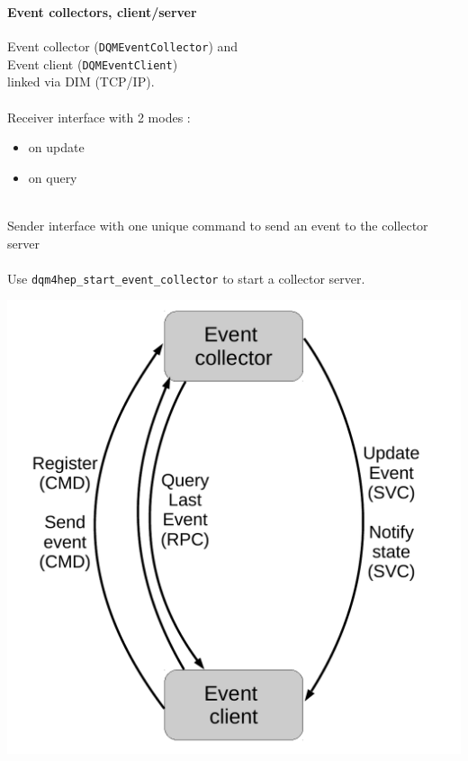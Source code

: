 \documentclass[8pt]{beamer}
\begin{document}
  \begin{frame}[containsverbatim]
    \frametitle{\secname}
    \framesubtitle{Event collectors, client/server}
    
    \begin{minipage}{0.52\textwidth}
        Event collector (\verb|DQMEventCollector|) and \\
        Event client (\verb|DQMEventClient|) \\
        linked via DIM (TCP/IP).\\
        ~ \\
        Receiver interface with 2 modes :
        \begin{itemize}
          \item on update
          \item on query
        \end{itemize}
        ~ \\
        Sender interface with one unique command to send an event to the collector server \\
        ~ \\
        Use \verb|dqm4hep_start_event_collector| to start a collector server.
    \end{minipage}
    \begin{minipage}{0.42\textwidth}
      \begin{center}
        \includegraphics[width=\textwidth]{figs/event_collector_arch.pdf}        
      \end{center}      
    \end{minipage}
        
  \end{frame}
\end{document}
